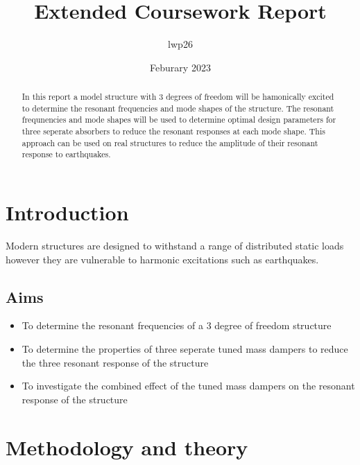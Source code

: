 \documentclass[8pt]{article}
\begin{document}
\title{Extended Coursework Report}
\author{lwp26}
\date{Feburary 2023}
\maketitle

\begin{abstract}
    \centering
    In this report a model structure with 3 degrees of freedom will be hamonically excited to determine the resonant frequencies and mode shapes of the structure.
    The resonant frequnencies and mode shapes will be used to determine optimal design parameters for three seperate absorbers to reduce the resonant responses at each mode shape.
    This approach can be used on real structures to reduce the amplitude of their resonant response to earthquakes.
\end{abstract}

\section{Introduction}


Modern structures are designed to withstand a range of distributed static loads however they are vulnerable to harmonic excitations such as earthquakes.


\subsection{Aims}

\begin{itemize}
\item To determine the resonant frequencies of a 3 degree of freedom structure
\item To determine the properties of three seperate tuned mass dampers to reduce the three resonant response of the structure
\item To investigate the combined effect of the tuned mass dampers on the resonant response of the structure
\end{itemize}

\section{Methodology and theory}
\end{document}
